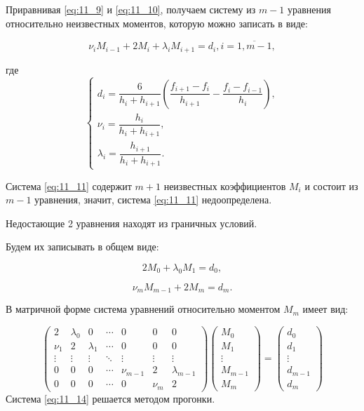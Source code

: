 Приравнивая \eqref{eq:11_9} и \eqref{eq:11_10}, получаем систему из $m - 1$ уравнения относительно неизвестных моментов, которую можно записать в виде:

\begin{equation}\label{eq:11_11}
  \nu_i M_{i - 1} + 2 M_i + \lambda_i M_{i + 1} = d_i, i = \overline{1, m - 1},
\end{equation}

где
\begin{equation*}
  \begin{cases}
    d_i = \dfrac{6}{h_i + h_{i + 1}} \left( \dfrac{f_{i + 1} - f_i}{h_{i + 1}} - \dfrac{f_{i} - f_{i - 1}}{h_{i}} \right), \\
    \nu_i = \dfrac{h_i}{h_i + h_{i + 1}}, \\
    \lambda_i = \dfrac{h_{i + 1}}{h_i + h_{i + 1}}.
  \end{cases}
\end{equation*}

Система \eqref{eq:11_11} содержит $m+1$ неизвестных коэффициентов $M_i$ и состоит из $m-1$ уравнения, значит, система \eqref{eq:11_11} недоопределена.

Недостающие 2 уравнения находят из граничных условий.

Будем их записывать в общем виде:

\begin{equation*}
  2 M_0 + \lambda_0 M_1 = d_0,
\end{equation*}

\begin{equation*}
  \nu_m M_{m - 1} + 2 M_m = d_m.
\end{equation*}

В матричной форме система уравнений относительно моментом $M_m$ имеет вид:

\begin{equation}\label{eq:11_14}
\begin{pmatrix}
  2 & \lambda_0 & 0 & \cdots & 0 & 0 & 0\\
  \nu_1 & 2 & \lambda_1 & \cdots & 0 & 0 & 0 \\
  \vdots  & \vdots & \vdots & \ddots & \vdots & \vdots & \vdots \\
  0 & 0 & 0 & \cdots & \nu_{m - 1} & 2 & \lambda_{m - 1} \\
  0 & 0 & 0 & \cdots & 0 & \nu_m & 2
 \end{pmatrix} \begin{pmatrix}
  M_0 \\
  M_1 \\
  \vdots \\
  M_{m-1} \\
  M_m
 \end{pmatrix}
 =
 \begin{pmatrix}
  d_0 \\
  d_1 \\
  \vdots \\
  d_{m-1} \\
  d_m
 \end{pmatrix}
 \end{equation}
Система \eqref{eq:11_14} решается методом прогонки.

